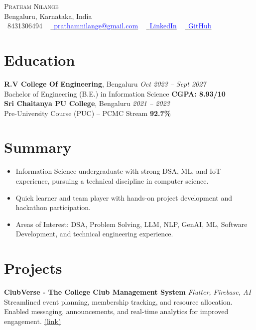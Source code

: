 \documentclass[letterpaper,10.5pt]{article}
\newcommand{\resumeItem}[1]{\item\small{#1}}
\newcommand{\resumeItemListStart}{\begin{itemize}[noitemsep,topsep=0pt,parsep=0pt,partopsep=0pt]}
\newcommand{\resumeItemListEnd}{\end{itemize}}
\begin{document}
\begin{center}
    {\Huge \scshape Pratham Nilange} \\ \vspace{1pt}
    Bengaluru, Karnataka, India \\ \vspace{1pt}
    \small \faPhone\ 8431306494 ~ 
    \href{mailto:prathamnilange@gmail.com}{\faEnvelope\ \textcolor{blue}{prathamnilange@gmail.com}} ~ 
    \href{https://www.linkedin.com/in/pratham-nilange-b55773293/}{\faLinkedin\ \textcolor{blue}{LinkedIn}} ~
    \href{https://github.com/Protham1}{\faGithub\ \textcolor{blue}{GitHub}}
\end{center}

\section*{Education}
\noindent
\textbf{R.V College Of Engineering}, Bengaluru \hfill \textit{Oct 2023 -- Sept 2027} \\
Bachelor of Engineering (B.E.) in Information Science \hfill \textbf{CGPA: 8.93/10} \\[6pt]

\noindent
\textbf{Sri Chaitanya PU College}, Bengaluru \hfill \textit{2021 -- 2023} \\
Pre-University Course (PUC) – PCMC Stream \hfill \textbf{92.7\%}

\section{Summary}
\resumeItemListStart
    \resumeItem{Information Science undergraduate with strong DSA, ML, and IoT experience, pursuing a technical discipline in computer science.}
    \resumeItem{Quick learner and team player with hands-on project development and hackathon participation.}
    \resumeItem{Areas of Interest: DSA, Problem Solving, LLM, NLP, GenAI, ML, Software Development, and technical engineering experience.}
\resumeItemListEnd

\section*{Projects}
\noindent
\textbf{ClubVerse - The College Club Management System} \textit{Flutter, Firebase, AI} \\
Streamlined event planning, membership tracking, and resource allocation. Enabled messaging, announcements, and real-time analytics for improved engagement. \href{https://github.com/Protham1/Clubs}{(link)} \\[6pt]
\end{document}

